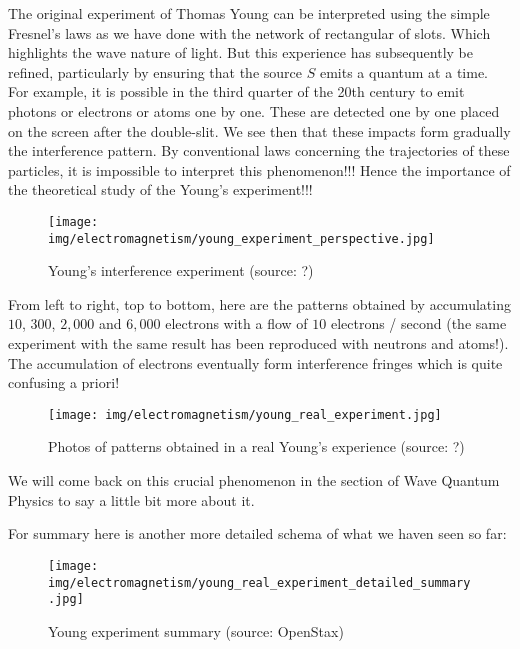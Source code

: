 	The original experiment of Thomas Young can be interpreted using the simple Fresnel's laws as we have done with the network of rectangular of slots. Which highlights the wave nature of light. But this experience has subsequently be refined, particularly by ensuring that the source $S$ emits a quantum at a time. For example, it is possible in the third quarter of the 20th century to emit photons or electrons or atoms one by one. These are detected one by one placed on the screen after the double-slit. We see then that these impacts form gradually the interference pattern. By conventional laws concerning the trajectories of these particles, it is impossible to interpret this phenomenon!!! Hence the importance of the theoretical study of the Young's experiment!!!
	\begin{figure}[H]
		\centering
		\texttt{[image: img/electromagnetism/young\_experiment\_perspective.jpg]}
		\caption{Young’s interference experiment (source: ?)}
	\end{figure}
	From left to right, top to bottom, here are the patterns obtained by accumulating $10$, $300$, $2,000$ and $6,000$ electrons with a flow of $10$ electrons / second (the same experiment with the same result has been reproduced with neutrons and atoms!). The accumulation of electrons eventually form interference fringes which is quite confusing a priori!
	\begin{figure}[H]
		\centering
		\texttt{[image: img/electromagnetism/young\_real\_experiment.jpg]}
		\caption[]{Photos of patterns obtained in a real Young's experience (source: ?)}
	\end{figure}
	We will come back on this crucial phenomenon in the section of Wave Quantum Physics to say a little bit more about it.
	
	For summary here is another more detailed schema of what we haven seen so far:
	\begin{figure}[H]
		\centering
		\texttt{[image: img/electromagnetism/young\_real\_experiment\_detailed\_summary.jpg]}	
		\caption{Young experiment summary (source: OpenStax)}
	\end{figure}
		
	\pagebreak	
